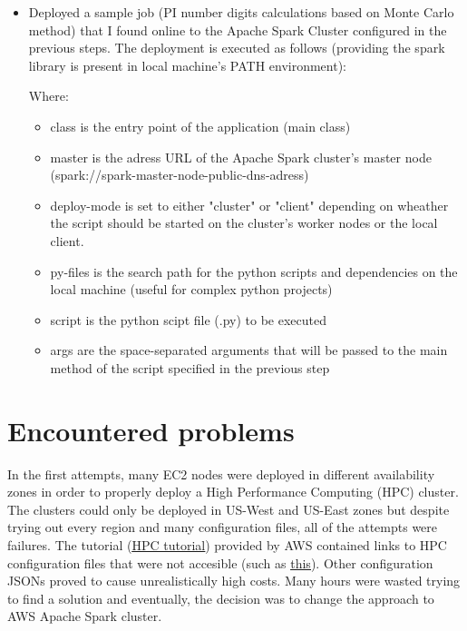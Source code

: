 \documentclass{customization}
\begin{document}
\begin{itemize}
\begin{itemize}
        \item 
    \end{itemize}
    \item Deployed a sample job (PI number digits calculations based on Monte Carlo method) that I found online to the Apache Spark Cluster configured in the previous steps. The deployment is executed as follows (providing the spark library is present in local machine's PATH environment):
    Where:
    \begin{itemize}
        \item class is the entry point of the application (main class)
        \item master is the adress URL of the Apache Spark cluster's master node (spark://spark-master-node-public-dns-adress)
        \item deploy-mode is set to either "cluster" or "client" depending on wheather the script should be started on the cluster's worker nodes or the local client.
        \item py-files is the search path for the python scripts and dependencies on the local machine (useful for complex python projects)
        \item script is the python scipt file (.py) to be executed
        \item args are the space-separated arguments that will be passed to the main method of the script specified in the previous step
    \end{itemize}

\end{itemize}


\section{Encountered problems}

\hspace{\parindent}
In the first attempts, many EC2 nodes were deployed in different availability zones in order to properly deploy a High Performance Computing (HPC) cluster. The clusters could only be deployed in US-West and US-East zones but despite trying out every region and many configuration files, all of the attempts were failures. The tutorial (\underline{\href{https://aws.amazon.com/hpc/sc15/getting-started/}{HPC tutorial}}) provided by AWS contained links to HPC configuration files that were not accesible (such as \underline{\href{https://s3.amazonaws.com/cfncluster-public-scripts/cfncluster-simple-cfd.cfn.json}{this}}). Other configuration JSONs proved to cause unrealistically high costs. Many hours were wasted trying to find a solution and eventually, the decision was to change the approach to AWS Apache Spark cluster.
\end{document}

